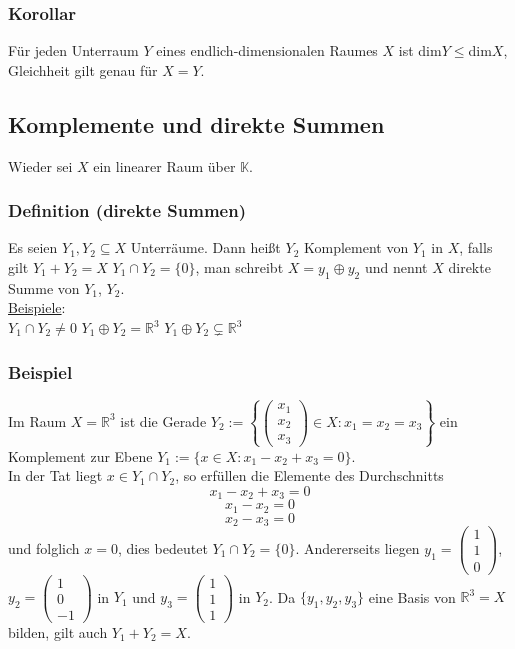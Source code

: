 \subsubsection{Korollar}
Für jeden Unterraum $Y$ eines endlich-dimensionalen Raumes $X$ ist dim$Y\leq$dim$X$, Gleichheit gilt genau für $X=Y$.
\subsection{Komplemente und direkte Summen}
Wieder sei $X$ ein linearer Raum über $\mathbb{K}$.
\subsubsection{Definition (direkte Summen)}
Es seien $Y_1,Y_2\subseteq X$ Unterräume. Dann heißt $Y_2$ Komplement von $Y_1$ in $X$, falls gilt $Y_1+Y_2=X$ $Y_1\cap Y_2=\{0\}$, man schreibt $X=y_1\oplus y_2$ und nennt $X$ direkte Summe von $Y_1$, $Y_2$.\\
\underline{Beispiele}:\\
$Y_1\cap Y_2 \neq 0$ $Y_1\oplus Y_2=\mathbb{R}^3$ $Y_1\oplus Y_2\subsetneq \mathbb{R}^3$
\subsubsection{Beispiel} 
Im Raum $X=\mathbb{R}^3$ ist die Gerade $Y_2:=\left\{\begin{pmatrix}x_1\\x_2\\x_3\end{pmatrix}\in X: x_1=x_2=x_3\right\}$ ein Komplement zur Ebene $Y_1:=\{x\in X: x_1-x_2+x_3=0\}$.\\
In der Tat liegt $x\in Y_1 \cap Y_2$, so erfüllen die Elemente des Durchschnitts\\
\[x_1-x_2+x_3=0\]
\[x_1-x_2=0\]
\[x_2-x_3=0\]
und folglich $x=0$, dies bedeutet $Y_1\cap Y_2=\{0\}$. Andererseits liegen $y_1=\begin{pmatrix}1\\1\\0\end{pmatrix}$, $y_2=\begin{pmatrix}1\\0\\-1\end{pmatrix}$ in $Y_1$ und $y_3=\begin{pmatrix}1\\1\\1\end{pmatrix}$ in $Y_2$. Da $\{y_1,y_2,y_3\}$ eine Basis von $\mathbb{R}^3=X$ bilden, gilt auch $Y_1+Y_2=X$.
